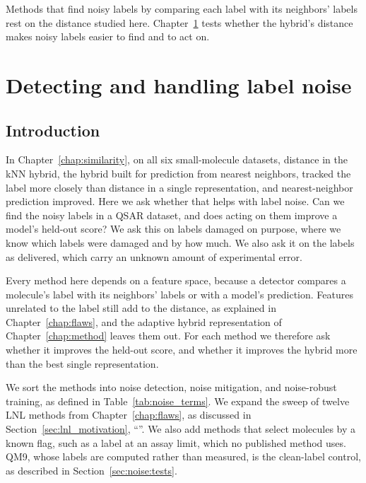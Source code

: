 Methods that find noisy labels by comparing each label with its neighbors' labels rest on the distance studied here. Chapter~\ref{chap:noise} tests whether the hybrid's distance makes noisy labels easier to find and to act on.

\chapter{Detecting and handling label noise}\label{chap:noise}

\section{Introduction}\label{sec:noise:intro}

In Chapter~\ref{chap:similarity}, on all six small-molecule datasets, distance in the kNN hybrid, the hybrid built for prediction from nearest neighbors, tracked the label more closely than distance in a single representation, and nearest-neighbor prediction improved. Here we ask whether that helps with label noise. Can we find the noisy labels in a QSAR dataset, and does acting on them improve a model's held-out score? We ask this on labels damaged on purpose, where we know which labels were damaged and by how much. We also ask it on the labels as delivered, which carry an unknown amount of experimental error.

Every method here depends on a feature space, because a detector compares a molecule's label with its neighbors' labels or with a model's prediction. Features unrelated to the label still add to the distance, as explained in Chapter~\ref{chap:flaws}, and the adaptive hybrid representation of Chapter~\ref{chap:method} leaves them out. For each method we therefore ask whether it improves the held-out score, and whether it improves the hybrid more than the best single representation.

We sort the methods into noise detection, noise mitigation, and noise-robust training, as defined in Table~\ref{tab:noise_terms}. We expand the sweep of twelve LNL methods from Chapter~\ref{chap:flaws}, as discussed in Section~\ref{sec:lnl_motivation}, ``''. We also add methods that select molecules by a known flag, such as a label at an assay limit, which no published method uses. QM9, whose labels are computed rather than measured, is the clean-label control, as described in Section~\ref{sec:noise:tests}.

